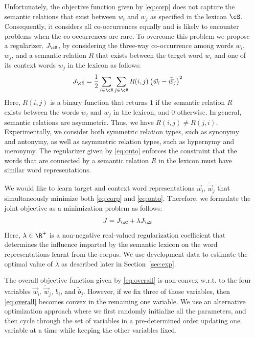 \documentclass[letterpaper]{article}
\begin{document}
Unfortunately, the objective function given by \eqref{eq:corp} does not capture the semantic relations that exist between $w_i$ and $w_j$
as specified in the lexicon $\cS$. Consequently, it considers all co-occurrences equally and is likely to encounter problems when the
co-occurrences are rare. 
To overcome this problem we propose a regularizer, $J_{\cS}$,  by considering the three-way co-occurrence
among words $w_i$, $w_j$, and a semantic relation $R$ that exists between the target word $w_i$ and 
one of its context words $w_j$ in the lexicon as follows:
\begin{equation}
\small
\label{eq:onto}
J_{\cS} = \frac{1}{2} \sum_{i \in \cV}  \sum_{j \in \cV} R(i,j) \left(\vec{w}_i - \tilde{\vec{w}}_j \right)^2 
\end{equation}
Here, $R(i,j)$ is a binary function that returns $1$ if  the semantic relation $R$ exists between the words $w_i$ and $w_j$
in the lexicon, and $0$ otherwise. 
In general, semantic relations are asymmetric. Thus, we have $R(i,j) \neq R(j,i)$.
Experimentally, we consider both symmetric relation types, such as synonymy and antonymy, as well as
asymmetric relation types, such as hypernymy and meronymy. 
The regularizer given by \eqref{eq:onto} enforces the constraint that the words that are connected by a semantic relation $R$ in the
lexicon must have similar word representations.

We would like to learn target and context word representations  $\vec{w}_i$, $\tilde{\vec{w}}_j$ 
that simultaneously minimize both \eqref{eq:corp} and \eqref{eq:onto}.
Therefore, we formulate the joint objective as a minimization problem as follows:
\begin{equation}
\small
\label{eq:overall}
J = J_{\cC} + \lambda J_{\cS}
\end{equation}
Here, $\lambda \in \R^+$ is a non-negative real-valued regularization coefficient that determines
the influence imparted by the semantic lexicon on the word representations learnt from the corpus. 
We use development data to estimate the optimal value of $\lambda$ as described later in Section~\ref{sec:exp}.

The overall objective function given by \eqref{eq:overall} is non-convex w.r.t. to the four variables $\vec{w}_i$, $\tilde{\vec{w}}_j$, $b_i$, and
$\tilde{b}_j$. However, if we fix three of those variables, then \eqref{eq:overall} becomes convex in the remaining one variable.
We use an alternative optimization approach where we first randomly initialize all the parameters, and then cycle through the set of variables
in a pre-determined order updating one variable at a time while keeping the other variables fixed.
\end{document}
